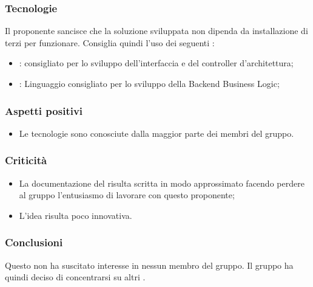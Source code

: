 \documentclass[]{article}
\begin{document}
            \subsubsection{Tecnologie}
            Il proponente sancisce che la soluzione sviluppata non dipenda da installazione di  terzi per funzionare.
            Consiglia quindi l'uso dei seguenti :
            \begin{itemize}
                \item {}:  consigliato per lo sviluppo dell'interfaccia e del controller d'architettura;
                \item {}: Linguaggio consigliato per lo sviluppo della Backend Business Logic;
            \end{itemize}


            \subsubsection{Aspetti positivi}
            \begin{itemize}
                \item Le tecnologie sono conosciute dalla maggior parte dei membri del gruppo.
            \end{itemize}

            \subsubsection{Criticità}
            \begin{itemize}
                \item La documentazione del  risulta scritta in modo approssimato facendo perdere al gruppo l'entusiasmo di lavorare con questo proponente;
                \item L'idea risulta poco innovativa.
            \end{itemize}

            \subsubsection{Conclusioni}
            Questo  non ha suscitato interesse in nessun membro del gruppo. Il gruppo ha quindi deciso di  concentrarsi su altri .
\end{document}
